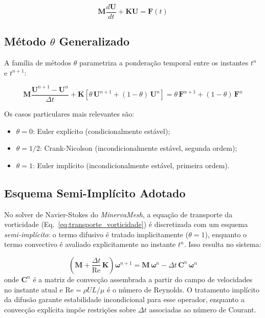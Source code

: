 \begin{equation}
\mathbf{M} \frac{d\mathbf{U}}{dt} + \mathbf{K} \mathbf{U} = \mathbf{F}(t)
\label{eq:semidiscreto}
\end{equation}

\subsection{Método $\theta$ Generalizado}

A família de métodos $\theta$ parametriza a ponderação temporal entre os instantes $t^n$ e $t^{n+1}$:

\begin{equation}
\mathbf{M} \frac{\mathbf{U}^{n+1} - \mathbf{U}^n}{\Delta t} + \mathbf{K} \left[ \theta \, \mathbf{U}^{n+1} + (1 - \theta) \, \mathbf{U}^n \right] = \theta \, \mathbf{F}^{n+1} + (1 - \theta) \, \mathbf{F}^n
\label{eq:theta_method}
\end{equation}

Os casos particulares mais relevantes são:
\begin{itemize}
    \item $\theta = 0$: Euler explícito (condicionalmente estável);
    \item $\theta = 1/2$: Crank-Nicolson (incondicionalmente estável, segunda ordem);
    \item $\theta = 1$: Euler implícito (incondicionalmente estável, primeira ordem).
\end{itemize}

\subsection{Esquema Semi-Implícito Adotado}
\label{sec:semi_implicito}

No solver de Navier-Stokes do \textit{MinervaMesh}, a equação de transporte da vorticidade (Eq.~\ref{eq:transporte_vorticidade}) é discretizada com um esquema \textit{semi-implícito}: o termo difusivo é tratado implicitamente ($\theta = 1$), enquanto o termo convectivo é avaliado explicitamente no instante $t^n$. Isso resulta no sistema:

\begin{equation}
\boxed{\left( \mathbf{M} + \frac{\Delta t}{\text{Re}} \, \mathbf{K} \right) \boldsymbol{\omega}^{n+1} = \mathbf{M} \, \boldsymbol{\omega}^n - \Delta t \, \mathbf{C}^n \, \boldsymbol{\omega}^n}
\label{eq:sistema_temporal_ns}
\end{equation}
onde $\mathbf{C}^n$ é a matriz de convecção assembrada a partir do campo de velocidades no instante atual e $\text{Re} = \rho U L / \mu$ é o número de Reynolds. O tratamento implícito da difusão garante estabilidade incondicional para esse operador, enquanto a convecção explícita impõe restrições sobre $\Delta t$ associadas ao número de Courant.

